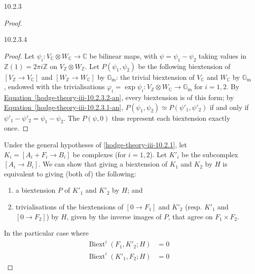 \begin{construction}{10.2.3}
\begin{proof}
\begin{lemma}{10.2.3.4}
\begin{enumerate}
        \end{enumerate}\begin{proof}\par{}Let \(\psi _i\colon  V_\mathbb {C}\otimes  W_\mathbb {C}\to \mathbb {C}\) be bilinear maps, with \(\psi =\psi _1-\psi _2\) taking values in \(\mathbb {Z}(1)=2\pi  i\mathbb {Z}\) on \(V_\mathbb {Z}\otimes  W_\mathbb {Z}\).
          Let \(P(\psi _1,\psi _2)\) be the following biextension of \([V_\mathbb {Z}\to  V_\mathbb {C}]\) and \([W_\mathbb {Z}\to  W_\mathbb {C}]\) by \(\mathbb {G}_\mathrm {m}\): the trivial biextension of \(V_\mathbb {C}\) and \(W_\mathbb {C}\) by {\(\mathbb {G}_\mathrm {m}\)}, endowed with the trivialisations \(\varphi _i=\exp \psi _i\colon  V_\mathbb {Z}\otimes  W_\mathbb {C}\to \mathbb {G}_\mathrm {m}\) for \(i=1,2\).
          By \hyperref[hodge-theory-iii-10.2.3.2-an]{Equation~\ref*{hodge-theory-iii-10.2.3.2-an}}, every biextension is of this form;
          by \hyperref[hodge-theory-iii-10.2.3.1-an]{Equation~\ref*{hodge-theory-iii-10.2.3.1-an}}, \(P(\psi _1,\psi _2)\simeq  P(\psi '_1,\psi '_2)\) if and only if \(\psi '_1-\psi '_2=\psi _1-\psi _2\).
          The \(P(\psi ,0)\) thus represent each biextension exactly once.\end{proof}\end{lemma}\label{hodge-theory-iii-10.2.3.5}\par{}Under the general hypotheses of \cref{hodge-theory-iii-10.2.1}, let \(K_i=[A_i+F_i\to  B_i]\) be complexes (for \(i=1,2\)).
        Let \(K'_i\) be the subcomplex \([A_i\to  B_i]\).
        We can show that giving a biextension of \(K_1\) and \(K_2\) by \(H\) is equivalent to giving (both of) the following:

        
 \begin{enumerate}
          
 \item[(a)]
            a biextension \(P\) of \(K'_1\) and \(K'_2\) by \(H\); and
          

          
 \item[(b)]
            trivialisations of the biextensions of \([0\to  F_1]\) and \(K'_2\) (resp. \(K'_1\) and \([0\to  F_2]\)) by \(H\), given by the inverse images of \(P\), that agree on \(F_1\times  F_2\).
          

        \end{enumerate}\par{}In the particular case where
        \[           \begin {aligned}             \operatorname {Biext}^i(F_1,K'_2;H)             &= 0           \\\operatorname {Biext}^i(K'_1,F_2;H)             &= 0           \end {aligned}         \]
        

\end{proof}
\end{construction}
